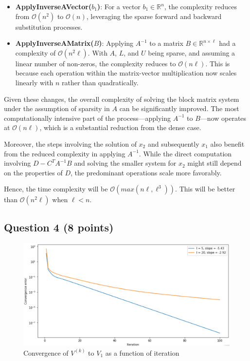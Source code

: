 \documentclass[11pt,onecolumn]{article}
\begin{document}
\begin{enumerate}[label=(\alph*)]
          \begin{itemize}
              \item \textbf{ApplyInverseAVector(\(b_1\))}: For a vector \(b_1 \in \mathbb{R}^n\), the complexity reduces from \(\mathcal{O}(n^2)\) to \(\mathcal{O}(n)\), leveraging the sparse forward and backward substitution processes.
              \item \textbf{ApplyInverseAMatrix(\(B\))}: Applying \(A^{-1}\) to a matrix \(B \in \mathbb{R}^{n \times \ell}\) had a complexity of \(\mathcal{O}(n^2\ell)\). With \(A\), \(L\), and \(U\) being sparse, and assuming a linear number of non-zeros, the complexity reduces to \(\mathcal{O}(n\ell)\). This is because each operation within the matrix-vector multiplication now scales linearly with \(n\) rather than quadratically.
          \end{itemize}

          Given these changes, the overall complexity of solving the block matrix system under the assumption of sparsity in \(A\) can be significantly improved. The most computationally intensive part of the process—applying \(A^{-1}\) to \(B\)—now operates at \(\mathcal{O}(n\ell)\), which is a substantial reduction from the dense case.

          Moreover, the steps involving the solution of \(x_2\) and subsequently \(x_1\) also benefit from the reduced complexity in applying \(A^{-1}\). While the direct computation involving \(D - C^TA^{-1}B\) and solving the smaller system for \(x_2\) might still depend on the properties of \(D\), the predominant operations scale more favorably.

          Hence, the time complexity will be $\mathcal{O}(max(n\ell, \ell^3)).$ This will be better than $\mathcal{O}(n^2\ell)$ when $\ell < n.$

\end{enumerate}


\subsection*{Question 4 (8 points)}
\begin{figure}
    \centering
    \includegraphics[totalheight=8cm]{convergence.png}
    \caption[]{Convergence of \( V^{(k)} \) to \( V_1 \) as a function of iteration}
    \label{fig:verticalcell}
\end{figure}
\end{document}
